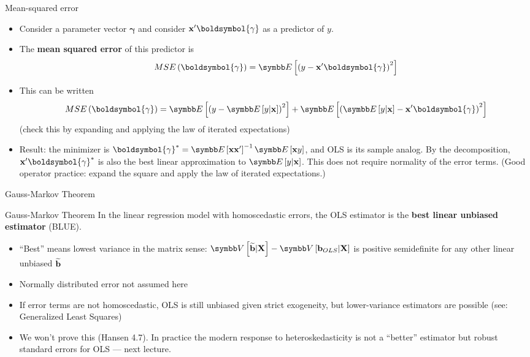 \documentclass[aspectratio=169,11pt]{beamer}
\begin{document}
\begin{frame}{Mean-squared error}
\begin{itemize}
	\item Consider a parameter vector $\boldsymbol{\gamma}$ and consider
	${\bf x}'\boldsymbol{\gamma}$ as a predictor of $y$. 

	\medskip
	\item The {\bf mean squared error} of this predictor is\[
	MSE\left(\boldsymbol{\gamma}\right) = \E\left[\left( y - {\bf x}' \boldsymbol{\gamma}\right)^{2}\right]
	\]

	\item This can be written\[
	MSE\left(\boldsymbol{\gamma}\right) = \E\left[ \left(y - \E\left[y | {\bf x}\right]\right)^{2}\right] + \E\left[  \left(\E\left[y | {\bf x}\right]- {\bf x}' \boldsymbol{\gamma}\right)^{2} \right]
	\]
	(check this by expanding and applying the law of iterated expectations)

	\item Result: the minimizer is $\boldsymbol{\gamma}^{*} = \E\left[{\bf x}{\bf x}'\right]^{-1}\E\left[{\bf x}y\right]$, and OLS is its
	sample analog. By the decomposition, ${\bf x}'\boldsymbol{\gamma}^{*}$ is also the best linear approximation to $\E\left[y|{\bf x}\right]$.
	This does not require normality of the error terms. (Good operator practice: expand the square and apply
	the law of iterated expectations.)

\end{itemize}
\end{frame}


\begin{frame}{Gauss-Markov Theorem}

\begin{block}{Gauss-Markov Theorem}
In the linear regression model with homoscedastic errors, the OLS estimator 
is the {\bf best linear unbiased estimator} (BLUE).
\end{block}

\begin{itemize}
	\item ``Best'' means lowest variance in the matrix sense: $\Var\left[\widetilde{{\bf b}}|{\bf X}\right] - \Var\left[{\bf b}_{OLS}|{\bf X}\right]$ is positive semidefinite for any other linear unbiased $\widetilde{{\bf b}}$

	\item Normally distributed error not assumed here

	\item If error terms are not homoscedastic, OLS is still unbiased given strict
	exogeneity, but lower-variance estimators are possible (see: Generalized Least Squares)

	\item We won't prove this (Hansen 4.7). In practice the modern response to
	heteroskedasticity is not a ``better'' estimator but \alert{robust standard errors}
	for OLS --- next lecture.

\end{itemize}
\end{frame}
\end{document}
